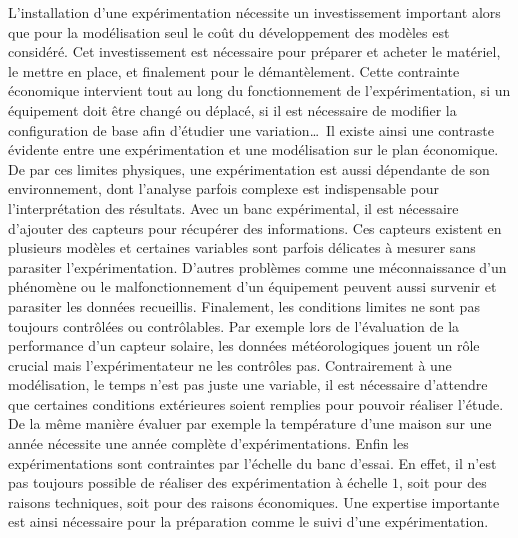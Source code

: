 L’installation d’une expérimentation nécessite un investissement important alors que pour la
modélisation seul le coût du développement des modèles est considéré. Cet investissement
est nécessaire pour préparer et acheter le matériel, le mettre en place, et finalement
pour le démantèlement. Cette contrainte économique intervient tout au long du
fonctionnement de l’expérimentation, si un équipement doit être changé ou déplacé, si il
est nécessaire de modifier la configuration de base afin d’étudier une variation\dots\ Il
existe ainsi une contraste évidente entre une expérimentation et une modélisation sur le
plan économique. De par ces limites physiques, une expérimentation est aussi dépendante de
son environnement, dont l’analyse parfois complexe est indispensable pour l’interprétation
des résultats.
Avec un banc expérimental, il est nécessaire d’ajouter des capteurs pour récupérer
des informations. Ces capteurs existent en plusieurs modèles et certaines variables sont
parfois délicates à mesurer sans parasiter l’expérimentation. D’autres problèmes comme une
méconnaissance d’un phénomène ou le malfonctionnement d’un équipement peuvent aussi
survenir et parasiter les données recueillis. Finalement, les conditions limites ne sont
pas toujours contrôlées ou contrôlables. Par exemple lors de l’évaluation de la
performance d’un capteur solaire, les données météorologiques jouent un rôle crucial mais
l’expérimentateur ne les contrôles pas. Contrairement à une modélisation, le temps n’est
pas juste une variable, il est nécessaire d’attendre que certaines conditions extérieures
soient remplies pour pouvoir réaliser l’étude. De la même manière évaluer par exemple la
température d’une maison sur une année nécessite une année complète d’expérimentations.
Enfin les expérimentations sont contraintes par l’échelle du banc d’essai. En effet, il n’est pas
toujours possible de réaliser des expérimentation à échelle $1$, soit pour des raisons
techniques, soit pour des raisons économiques. Une expertise importante est ainsi
nécessaire pour la préparation comme le suivi d’une expérimentation.


